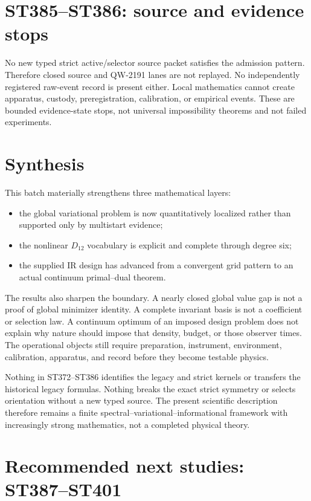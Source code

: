 \documentclass[11pt,a4paper]{article}
\begin{document}
\section{ST385--ST386: source and evidence stops}

No new typed strict active/selector source packet satisfies the admission pattern. Therefore
closed source and QW-2191 lanes are not replayed. No independently registered raw-event
record is present either. Local mathematics cannot create apparatus, custody,
preregistration, calibration, or empirical events. These are bounded evidence-state stops,
not universal impossibility theorems and not failed experiments.

\section{Synthesis}

This batch materially strengthens three mathematical layers:
\begin{itemize}
\item the global variational problem is now quantitatively localized rather than supported
only by multistart evidence;
\item the nonlinear $D_{12}$ vocabulary is explicit and complete through degree six;
\item the supplied IR design has advanced from a convergent grid pattern to an actual
continuum primal--dual theorem.
\end{itemize}

The results also sharpen the boundary. A nearly closed global value gap is not a proof of
global minimizer identity. A complete invariant basis is not a coefficient or selection law.
A continuum optimum of an imposed design problem does not explain why nature should impose
that density, budget, or those observer times. The operational objects still require
preparation, instrument, environment, calibration, apparatus, and record before they become
testable physics.

Nothing in ST372--ST386 identifies the legacy and strict kernels or transfers the historical
legacy formulas. Nothing breaks the exact strict symmetry or selects orientation without a
new typed source. The present scientific description therefore remains a finite
spectral--variational--informational framework with increasingly strong mathematics, not a
completed physical theory.

\section{Recommended next studies: ST387--ST401}
\end{document}
